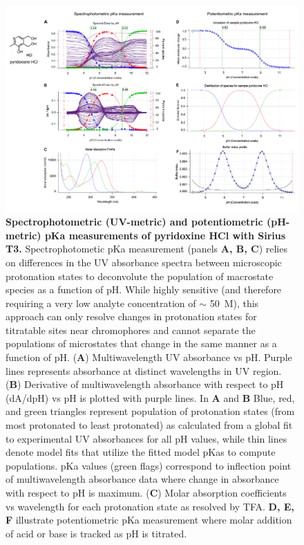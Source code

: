 \documentclass[9pt,lineno]{elife}
\begin{document}
\begin{figure}
\includegraphics[width=1.00\linewidth]{figures/UVmetric_vs_pHmetric_pKa_figure}
\caption{{\bf Spectrophotometric (UV-metric) and potentiometric (pH-metric) pKa measurements of pyridoxine HCl with Sirius T3.} 
Spectrophotometic pKa measurement (panels \textbf{A, B, C}) relies on differences in the UV absorbance spectra between microscopic protonation states to deconvolute the population of macrostate species as a function of pH.
While highly sensitive (and therefore requiring a very low analyte concentration of $\sim$ 50~\micro M), this approach can only resolve changes in protonation states for titratable sites near chromophores and cannot separate the populations of microstates that change in the same manner as a function of pH. 
(\textbf{A}) Multiwavelength UV absorbance vs pH. Purple lines represents absorbance at distinct wavelengths in UV region.
(\textbf{B}) Derivative of multiwavelength absorbance with respect to pH (dA/dpH) vs pH is plotted with purple lines. 
In \textbf{A} and \textbf{B} Blue, red, and green triangles represent population of protonation states (from most protonated to least protonated) as calculated from a global fit to experimental UV absorbances for all pH values, while thin lines denote model fits that utilize the fitted model pKas to compute populations.
pKa values (green flags) correspond to inflection point of multiwavelength absorbance data where change in absorbance with respect to pH is maximum. 
(\textbf{C}) Molar absorption coefficients vs wavelength for each protonation state as resolved by TFA. 
\textbf{D, E, F} illustrate potentiometric pKa measurement where molar addition of acid or base is tracked as pH is titrated.
}
\end{figure}
\end{document}
